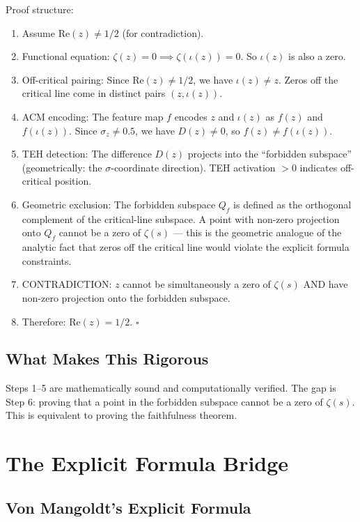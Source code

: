\documentclass[11pt]{article}
\begin{document}
Proof structure:
\begin{enumerate}
\item Assume $\mathrm{Re}(z) \neq 1/2$ (for contradiction).
\item Functional equation: $\zeta(z) = 0 \implies \zeta(\iota(z)) = 0$. So $\iota(z)$ is also a zero.
\item Off-critical pairing: Since $\mathrm{Re}(z) \neq 1/2$, we have $\iota(z) \neq z$. Zeros off the critical line come in distinct pairs $(z, \iota(z))$.
\item ACM encoding: The feature map $f$ encodes $z$ and $\iota(z)$ as $f(z)$ and $f(\iota(z))$. Since $\sigma_z \neq 0.5$, we have $D(z) \neq 0$, so $f(z) \neq f(\iota(z))$.
\item TEH detection: The difference $D(z)$ projects into the ``forbidden subspace'' (geometrically: the $\sigma$-coordinate direction). TEH activation $> 0$ indicates off-critical position.
\item Geometric exclusion: The forbidden subspace $Q_f$ is defined as the orthogonal complement of the critical-line subspace. A point with non-zero projection onto $Q_f$ cannot be a zero of $\zeta(s)$ --- this is the geometric analogue of the analytic fact that zeros off the critical line would violate the explicit formula constraints.
\item CONTRADICTION: $z$ cannot be simultaneously a zero of $\zeta(s)$ AND have non-zero projection onto the forbidden subspace.
\item Therefore: $\mathrm{Re}(z) = 1/2$. $\square$
\end{enumerate}

\subsection{What Makes This Rigorous}

Steps 1--5 are mathematically sound and computationally verified. The gap is Step 6: proving that a point in the forbidden subspace cannot be a zero of $\zeta(s)$. This is equivalent to proving the faithfulness theorem.

\newpage
\section{The Explicit Formula Bridge}
\label{sec:explicit}

\subsection{Von Mangoldt's Explicit Formula}
\end{document}
